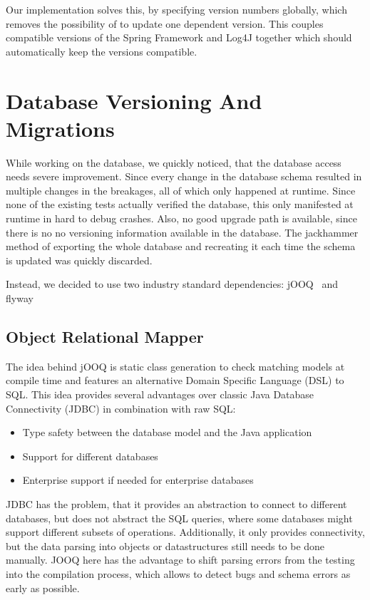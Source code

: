 Our implementation solves this, by specifying version numbers globally, which removes the possibility of 
to update one dependent version.
This couples compatible versions of the Spring Framework and Log4J together which should automatically keep the versions
compatible.

\section{Database Versioning And Migrations}\label{sec:databaseVersioningAndMigrations}
While working on the database, we quickly noticed, that the database access needs severe improvement.
Since every change in the database schema resulted in multiple changes in the breakages, all of which only happened at
runtime.
Since none of the existing tests actually verified the database, this only manifested at runtime in hard to debug
crashes.
Also, no good upgrade path is available, since there is no no versioning information available in the database.
The jackhammer method of exporting the whole database and recreating it each time the schema is updated was quickly
discarded.

Instead, we decided to use two industry standard dependencies: jOOQ~\cite{jooq} and flyway~\cite{flyway}

\subsection*{Object Relational Mapper}
The idea behind jOOQ is static class generation to check matching models at compile time and features an alternative
Domain Specific Language (DSL) to SQL\@.
This idea provides several advantages over classic Java Database Connectivity (JDBC) in combination with raw SQL:
\begin{itemize}
\item Type safety between the database model and the Java application
\item Support for different databases
\item Enterprise support if needed for enterprise databases
\end{itemize}

JDBC has the problem, that it provides an abstraction to connect to different databases, but does not abstract the
SQL queries, where some databases might support different subsets of operations.
Additionally, it only provides connectivity, but the data parsing into objects or datastructures still needs to be done
manually.
JOOQ here has the advantage to shift parsing errors from the testing into the compilation process, which allows to
detect bugs and schema errors as early as possible.


